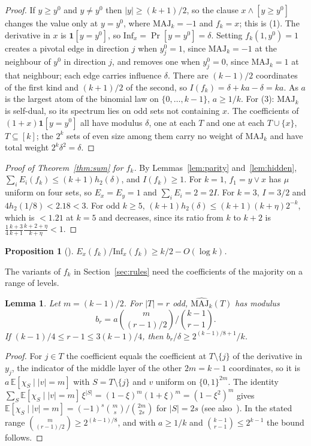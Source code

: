 \documentclass[11pt]{amsart}
\newtheorem{lemma}[theorem]{Lemma}
\newtheorem{proposition}[theorem]{Proposition}
\theoremstyle{remark}
\newcommand{\Inf}{\mathrm{Inf}}
\newcommand{\E}{\mathbb{E}}
\newcommand{\MAJ}{\mathrm{MAJ}}
\begin{document}
\begin{proof}
If $y\ge y^0$ and $y\ne y^0$ then $|y|\ge(k+1)/2$, so the clause $x\wedge[y\ge y^0]$ changes the value only at
$y=y^0$, where $\MAJ_k=-1$ and $f_k=x$; this is (1). The derivative in $x$ is $\mathbf 1[y=y^0]$, so
$\Inf_x=\Pr[y=y^0]=\delta$. Setting $f_k(1,y^0)=1$ creates a pivotal edge in direction $j$ when $y^0_j=1$, since $\MAJ_k=-1$ at the neighbour of $y^0$ in direction $j$, and removes one when $y^0_j=0$, since $\MAJ_k=1$ at that neighbour; each edge carries influence $\delta$.
There are $(k-1)/2$ coordinates of the first kind and $(k+1)/2$ of the second, so $I(f_k)=\delta+ka-\delta=ka$. As
$a$ is the largest atom of the binomial law on $\{0,\dots,k-1\}$, $a\ge1/k$. For (3): $\MAJ_k$ is self-dual, so its
spectrum lies on odd sets not containing $x$. The coefficients of $(1+x)\mathbf 1[y=y^0]$ all have modulus $\delta$,
one at each $T$ and one at each $T\cup\{x\}$, $T\subseteq[k]$; the $2^k$ sets of even size among them carry no weight
of $\MAJ_k$ and have total weight $2^k\delta^2=\delta$.
\end{proof}

\begin{proof}[Proof of Theorem~\ref{thm:sum} for $f_k$]
By Lemmas~\ref{lem:parity} and~\ref{lem:hidden}, $\sum_iE_i(f_k)\le(k+1)h_2(\delta)$, and $I(f_k)\ge1$. For $k=1$,
$f_1=y\vee x$ has $\mu$ uniform on four sets, so $E_x=E_y=1$ and $\sum_iE_i=2=2I$. For $k=3$, $I=3/2$ and
$4h_2(1/8)<2.18<3$. For odd $k\ge5$, $(k+1)h_2(\delta)\le(k+1)(k+\eta)2^{-k}$, which is $<1.21$ at $k=5$ and
decreases, since its ratio from $k$ to $k+2$ is $\frac14\frac{k+3}{k+1}\frac{k+2+\eta}{k+\eta}<1$.
\end{proof}

\begin{proposition}[{\cite[Proposition~5.1]{Shm3}}]\label{prop:diverge}
$E_x(f_k)/\Inf_x(f_k)\ge k/2-O(\log k)$.
\end{proposition}

The variants of $f_k$ in Section~\ref{sec:rules} need the coefficients of the majority on a range of levels.

\begin{lemma}\label{lem:maj}
Let $m=(k-1)/2$. For $|T|=r$ odd, $\widehat{\MAJ_k}(T)$ has modulus
\[
b_r=a\binom{m}{(r-1)/2}\Big/\binom{k-1}{r-1}.
\]
If $(k-1)/4\le r-1\le3(k-1)/4$, then $b_r/\delta\ge2^{(k-1)/8+1}/k$.
\end{lemma}

\begin{proof}
For $j\in T$ the coefficient equals the coefficient at $T\setminus\{j\}$ of the derivative in $y_j$, the indicator of
the middle layer of the other $2m=k-1$ coordinates, so it is $a\,\E[\chi_S\mid|v|=m]$ with $S=T\setminus\{j\}$ and $v$
uniform on $\{0,1\}^{2m}$. The identity $\sum_S\E[\chi_S\mid|v|=m]\,\xi^{|S|}=(1-\xi)^m(1+\xi)^m=(1-\xi^2)^m$ gives
$\E[\chi_S\mid |v|=m]=(-1)^s\binom ms/\binom{2m}{2s}$ for $|S|=2s$ (see also~\cite[Section~5.3]{ODo}). In the stated
range $\binom{m}{(r-1)/2}\ge2^{(k-1)/8}$, and with $a\ge1/k$ and $\binom{k-1}{r-1}\le2^{k-1}$ the bound follows.
\end{proof}
\end{document}
